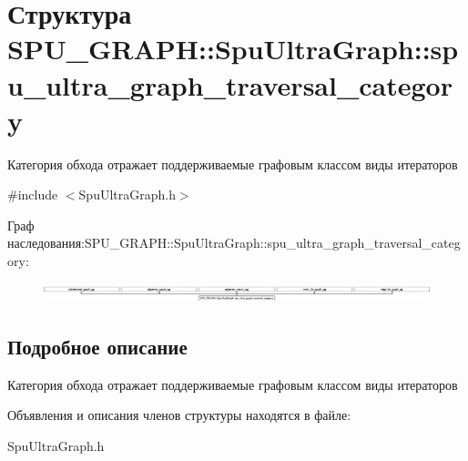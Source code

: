 \hypertarget{struct_s_p_u___g_r_a_p_h_1_1_spu_ultra_graph_1_1spu__ultra__graph__traversal__category}{}\section{Структура S\+P\+U\+\_\+\+G\+R\+A\+PH\+:\+:Spu\+Ultra\+Graph\+:\+:spu\+\_\+ultra\+\_\+graph\+\_\+traversal\+\_\+category}
\label{struct_s_p_u___g_r_a_p_h_1_1_spu_ultra_graph_1_1spu__ultra__graph__traversal__category}


Категория обхода отражает поддерживаемые графовым классом виды итераторов  




{\ttfamily \#include $<$Spu\+Ultra\+Graph.\+h$>$}

Граф наследования\+:S\+P\+U\+\_\+\+G\+R\+A\+PH\+:\+:Spu\+Ultra\+Graph\+:\+:spu\+\_\+ultra\+\_\+graph\+\_\+traversal\+\_\+category\+:\begin{figure}[H]
\begin{center}
\leavevmode
\includegraphics[height=0.567089cm]{struct_s_p_u___g_r_a_p_h_1_1_spu_ultra_graph_1_1spu__ultra__graph__traversal__category}
\end{center}
\end{figure}


\subsection{Подробное описание}
Категория обхода отражает поддерживаемые графовым классом виды итераторов 

Объявления и описания членов структуры находятся в файле\+:\begin{DoxyCompactItemize}
\item 
Spu\+Ultra\+Graph.\+h\end{DoxyCompactItemize}
